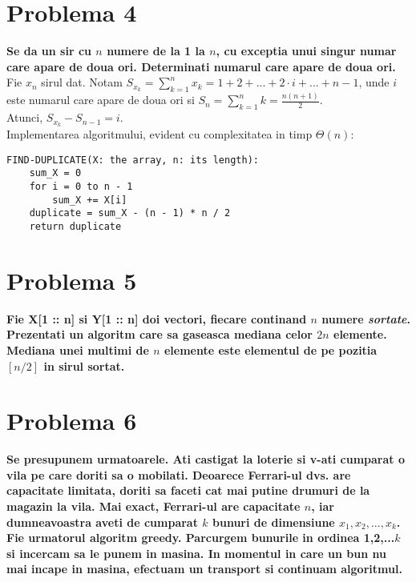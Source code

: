 \documentclass[12pt]{article}
\begin{document}
\section*{Problema 4}
{\bfseries Se da un sir cu $n$ numere de la 1 la $n$, cu exceptia unui singur numar care apare de doua ori. Determinati numarul care apare de doua ori.} \\

Fie $x_n$ sirul dat. Notam $S_{x_k} = \sum\limits_{k=1}^{n} {x_k} = 1 + 2 + ... + 2 \cdot i + ... + n - 1$, unde $i$ este numarul care apare de doua ori si $S_{n} = \sum\limits_{k=1}^{n} {k} = \frac{n(n+1)}{2}$. \\
Atunci, $S_{x_k} - S_{n - 1} = i$. \\
Implementarea algoritmului, evident cu complexitatea in timp $\Theta(n)$: \\
\begin{verbatim}
FIND-DUPLICATE(X: the array, n: its length):
    sum_X = 0
    for i = 0 to n - 1
        sum_X += X[i]
    duplicate = sum_X - (n - 1) * n / 2
    return duplicate
\end{verbatim}

\section*{Problema 5}
{\bfseries{Fie X[1 :: n] si Y[1 :: n] doi vectori, fiecare continand $n$ numere \textit{sortate}. Prezentati un algoritm care sa gaseasca mediana celor $2n$ elemente. Mediana unei multimi de $n$ elemente este elementul de pe pozitia $[n/2]$ in sirul sortat.}} \\



\newpage

\section*{Problema 6}
{\bfseries{Se presupunem urmatoarele. Ati castigat la loterie si v-ati cumparat o vila pe care doriti sa o mobilati. Deoarece Ferrari-ul dvs. are capacitate limitata, doriti sa faceti cat mai putine drumuri de la magazin la vila. Mai exact, Ferrari-ul are capacitate $n$, iar dumneavoastra aveti de cumparat $k$ bunuri de dimensiune $x_1, x_2, ..., x_k$.} \\ 
Fie urmatorul algoritm greedy. Parcurgem bunurile in ordinea 1,2,...$k$ si incercam sa le punem in masina. In momentul in care un bun nu mai incape in masina, efectuam un transport si continuam algoritmul.}
\end{document}
